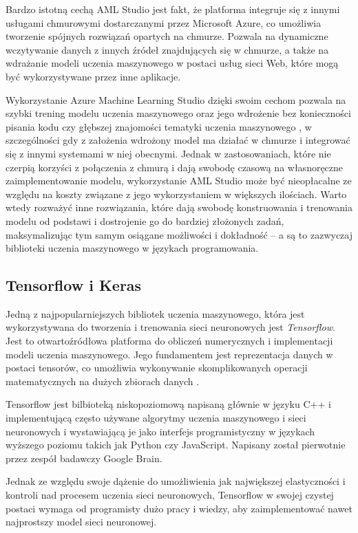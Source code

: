 Bardzo istotną cechą AML Studio jest fakt, że platforma integruje się z innymi usługami chmurowymi dostarczanymi przez Microsoft Azure, co umożliwia tworzenie spójnych rozwiązań opartych na chmurze.
Pozwala na dynamiczne wczytywanie danych z innych źródeł znajdujących się w chmurze, a także na wdrażanie modeli uczenia maszynowego w postaci usług sieci Web, które mogą być wykorzystywane przez inne aplikacje.

Wykorzystanie Azure Machine Learning Studio dzięki swoim cechom pozwala na szybki trening modelu uczenia maszynowego oraz jego wdrożenie bez konieczności pisania kodu czy głębszej znajomości tematyki uczenia maszynowego \cite{mukunthu2019practical}, w szczególności gdy z założenia wdrożony model ma działać w chmurze i integrować się z innymi systemami w niej obecnymi.
Jednak w zastosowaniach, które nie czerpią korzyści z połączenia z chmurą i dają swobodę czasową na własnoręczne zaimplementowanie modelu, wykorzystanie AML Studio może być nieopłacalne ze względu na koszty związane z jego wykorzystaniem w większych ilościach.
Warto wtedy rozważyć inne rozwiązania, które dają swobodę konstruowania i trenowania modelu od podstawi i dostrojenie go do bardziej złożonych zadań, maksymalizując tym samym osiągane możliwości i dokładność -- a są to zazwyczaj biblioteki uczenia maszynowego w językach programowania.

\subsection{Tensorflow i Keras}

Jedną z najpopularniejszych bibliotek uczenia maszynowego, która jest wykorzystywana do tworzenia i trenowania sieci neuronowych jest \emph{Tensorflow}.
Jest to otwartoźródłowa platforma do obliczeń numerycznych i implementacji modeli uczenia maszynowego.
Jego fundamentem jest reprezentacja danych w postaci tensorów, co umożliwia wykonywanie skomplikowanych operacji matematycznych na dużych zbiorach danych \cite{shukla2018machine}.

Tensorflow jest bilbioteką niskopoziomową napisaną głównie w języku C++ i implementującą często używane algorytmy uczenia maszynowego i sieci neuronowych i wystawiającą je jako interfejs programistyczny w językach wyższego poziomu takich jak Python czy JavaScript.
Napisany został pierwotnie przez zespół badawczy Google Brain.

Jednak ze względu swoje dążenie do umożliwienia jak największej elastyczności i kontroli nad procesem uczenia sieci neuronowych, Tensorflow w swojej czystej postaci wymaga od programisty dużo pracy i wiedzy, aby zaimplementować nawet najprostszy model sieci neuronowej.

